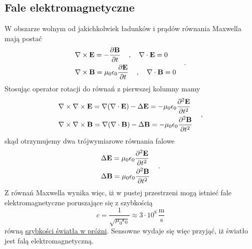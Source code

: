 \documentclass[../main.tex]{subfiles}
\begin{document}
\subsection{Fale elektromagnetyczne}
W obszarze wolnym od jakichkolwiek ładunków i prądów równania Maxwella mają postać
\begin{equation*}
    \begin{split}
        &\nabla\times\mathbf{E}=-\pdv{\mathbf{B}}{t}\quad\,,\quad\nabla\cdot\mathbf{E}=0\\
        &\nabla\times\mathbf{B}=\mu_0\epsilon_0\pdv{\mathbf{E}}{t}\quad\,,\quad\nabla\cdot\mathbf{B}=0
    \end{split}\quad\,.
\end{equation*}
Stosując operator rotacji do równań z pierwszej kolumny mamy
\begin{equation*}
\begin{split}
    &\nabla\times\nabla\times\mathbf{E}=\nabla(\nabla\cdot\mathbf{E})-\Delta\mathbf{E}=-\mu_0\epsilon_0\pdv[2]{\mathbf{E}}{t}\\
    &\nabla\times\nabla\times\mathbf{B}=\nabla(\nabla\cdot\mathbf{B})-\Delta\mathbf{B}=-\mu_0\epsilon_0\pdv[2]{\mathbf{B}}{t}
\end{split}\quad\,,
\end{equation*}
skąd otrzymujemy dwa trójwymiarowe równania falowe
\begin{equation*}
    \begin{split}
        &\Delta\mathbf{E}=\mu_0\epsilon_0\pdv[2]{\mathbf{E}}{t}\\
        &\Delta\mathbf{B}=\mu_0\epsilon_0\pdv[2]{\mathbf{B}}{t}
    \end{split}\quad\,.
\end{equation*}
Z równań Maxwella wynika więc, iż w pustej przestrzeni mogą istnieć fale elektromagnetyczne poruszające się z szybkością
\begin{equation*}
    c=\frac{1}{\sqrt{\mu_0\epsilon_0}}\approx 3\cdot10^8\,\frac{\text{m}}{\text{s}}
\end{equation*}
równą \underline{szybkości światła w próżni}. Sensowne wydaje się więc przyjąć, iż światło jest falą elektromagnetyczną.
\end{document}
